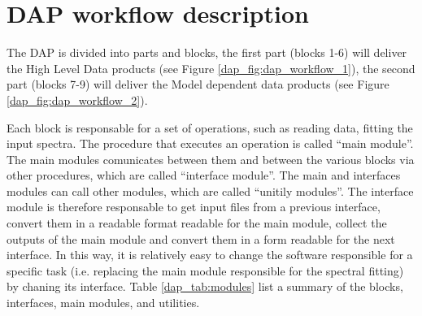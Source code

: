 \section{DAP workflow description}
\label{dap_sec:dap_workflow}

The DAP is divided into parts and blocks, the first part (blocks 1-6)
will deliver the High Level Data products (see Figure
\ref{dap_fig:dap_workflow_1}), the second part (blocks 7-9) will
deliver the Model dependent data products (see Figure
\ref{dap_fig:dap_workflow_2}). 

Each block is responsable for a set of operations, such as reading
data, fitting the input spectra. The procedure that executes an
operation is called ``main module''. The main modules comunicates
between them and between the various blocks via other procedures,
which are called ``interface module''. The main and interfaces modules
can call other modules, which are called ``unitily modules''. The
interface module is therefore responsable to get input files from a
previous interface, convert them in a readable format readable for the
main module, collect the outputs of the main module and convert them
in a form readable for the next interface. In this way, it is
relatively easy to change the software responsible for a specific task
(i.e. replacing the main module responsible for the spectral fitting)
by chaning its interface.  Table \ref{dap_tab:modules} list a summary
of the blocks, interfaces, main modules, and utilities.


